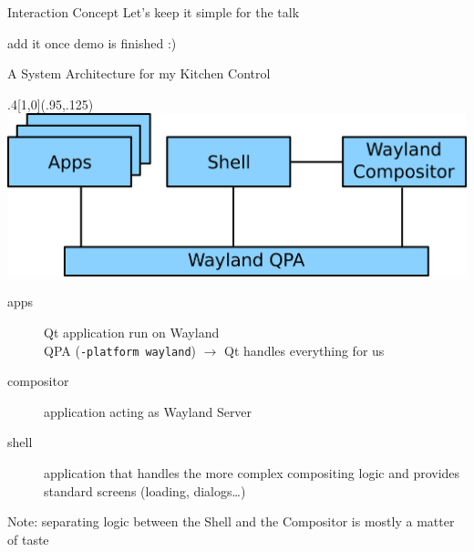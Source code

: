 \documentclass[ucs,9pt]{beamer}
\begin{document}
\begin{frame}
    {Interaction Concept}
    {Let's keep it simple for the talk}

    \alert{add it once demo is finished :)}

\end{frame}


\begin{frame}
    {A System Architecture for my Kitchen Control}

    \begin{textblock*}{.4\paperwidth}[1,0](.95\paperwidth,.125\paperheight)%
        \includegraphics[width=\linewidth]{architecture.png}
    \end{textblock*}%

    \begin{description}
        \item [apps] Qt application run on Wayland\\
            QPA ({\tt -platform wayland}) $\rightarrow$ Qt handles everything for us
        \item [compositor] application acting as Wayland Server
        \item [shell] application that handles the more complex compositing logic and provides
            standard screens (loading, dialogs\dots)
    \end{description}
    \bigskip

    Note: separating logic between the Shell and the Compositor is mostly a matter of taste
\end{frame}
\end{document}
